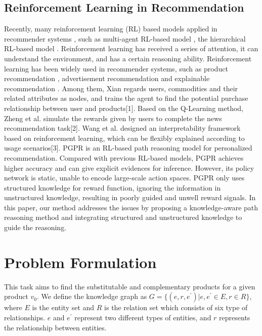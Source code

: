 \documentclass[review]{elsarticle}
\begin{document}
\begin{sloppypar}
\subsection{Reinforcement Learning in Recommendation}
Recently, many reinforcement learning (RL) based models applied in recommender systems \cite{chen2019generative,xiong2017deeppath_FormulationReasoning}, such as multi-agent RL-based model \cite{gui2019mention}, the hierarchical RL-based model \cite{zhang2019hierarchical}.
Reinforcement learning has received a series of attention, it can understand the environment, and has a certain reasoning ability. Reinforcement learning has been widely used in recommender systems, such as product recommendation \cite{xian2019reinforcement}, advertisement recommendation \cite{DRN} and explainable recommendation \cite{ER}. Among them, Xian regards users, commodities and their related attributes as nodes, and trains the agent to find the potential purchase relationship between user and products[1]. Based on the Q-Learning method, Zheng et al. simulate the rewards given by users to complete the news recommendation task[2]. Wang et al. designed an interpretability framework based on reinforcement learning, which can be flexibly explained according to usage scenarios[3].
 PGPR \cite{xian2019reinforcement} is an RL-based path reasoning model for personalized recommendation. Compared with previous RL-based models, PGPR achieves higher accuracy and can give 
explicit evidences for inference.
However, its policy network is static, unable to encode large-scale action spaces. PGPR only uses structured knowledge for reward function, ignoring the information in unstructured knowledge, resulting in poorly guided and unwell reward signals.
In this paper, our method addresses the issues by proposing a knowledge-aware path reasoning method and integrating structured and unstructured knowledge to guide the reasoning.


\section{Problem Formulation}
This task aims to find the substitutable and complementary products for a given product $v_{0}$.
We define the knowledge graph as $G=\{(e,r,e^{'})|e,e^{'} \in E, r \in R\}$, where $E$ is the entity set and $R$ is the relation set which consists of six type of relationships.
$e$ and $e^{'}$ represent two different types of entities, and $r$ represents the relationship between entities.


\end{sloppypar}
\end{document}
